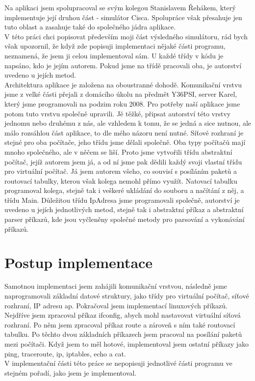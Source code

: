Na aplikaci jsem spolupracoval se svým kolegou Stanislavem Řehákem, který implementuje její druhou část - simulátor Cisca. Spolupráce však přesahuje jen tuto oblast a zasahuje také do společného jádra aplikace.\\
V této práci chci popisovat především moji část výsledného simulátoru, rád bych však upozornil, že když zde popisuji implementaci nějaké části programu, neznamená, že jsem ji celou implementoval sám. U každé třídy v kódu je napsáno, kdo je jejím autorem. Pokud jsme na třídě pracovali oba, je autorství uvedeno u jejích metod.\\
Architektura aplikace je založena na oboustranné dohodě.  Komunikační vrstvu jsme z velké části přejali z domácího úkolu na předmět Y36PSI, server Karel, který jsme programovali na podzim roku 2008. Pro potřeby naší aplikace jsme potom tuto vrstvu společně upravili. Jě těžké, připsat autorství této vrstvy jednomu nebo druhému z nás, ale vzhledem k tomu, že se jedná a sice nutnou, ale málo rozsáhlou část aplikace, to dle mého názoru není nutné. Síťové rozhraní je stejné pro oba počítače, jeho třídu jsme dělali společně. Oba typy počítačů mají mnoho společného, ale v něčem se liší. Proto jsme vytvořili třídu abstraktní počítač, jejíž autorem jsem já, a od ní jsme pak dědili každý svoji vlastní třídu pro virtuální počítač. Já jsem autorem všeho, co souvisí s posíláním paketů a routovací tabulky, kterou však kolega nemohl přímo využít. Natovací tabulku programoval kolega, stejně tak i veškeré ukládání do souboru a načítání z něj, a třídu Main. Důležitou třídu IpAdresa jsme programovali společně, autorství je uvedeno u jejích jednotlivých metod, stejně tak i abstraktní příkaz a abstraktní parser příkazů, kde jsou vyčleněny společné metody pro parsování a vykonávání příkazů.


\section{Postup implementace}

Samotnou implementaci jsem zahájili komunikační vrstvou, následně jsme naprogramovali základní datové struktury, jako třídy pro virtuální počítač, síťové rozhraní, IP adresu ap. Pokračoval jsem implementací linuxových příkazů. Nejdříve jsem zpracoval příkaz ifconfig, abych mohl nastavovat virtuální síťová rozhraní. Po něm jsem zpracoval příkaz route a zároveň s ním také routovací tabulku. Po těchto dvou základních příkazech jsem pracoval na posílání paketů mezi počítači. Když jsem to měl hotové, implementoval jsem ostatní příkazy jako ping, traceroute, ip, iptables, echo a cat.\\
V implementační části této práce se nepopisuji jednotlivé části programu ve stejném pořadí, jako jsem je implementoval.




